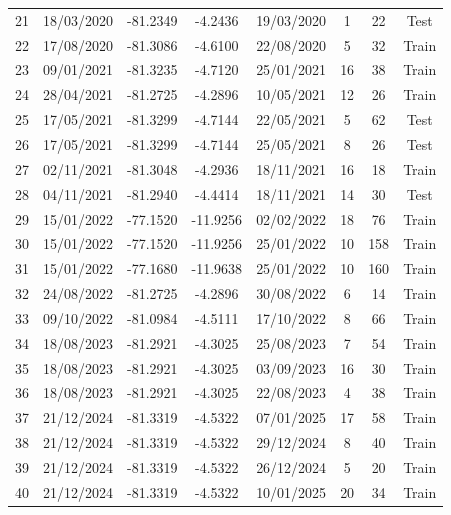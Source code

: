 \documentclass[11pt]{article}
\begin{document}
\begin{table}[htbp]
{\begin{tabular}{|c|c|c|c|c|c|c|c|}
21 & 18/03/2020 & -81.2349 & -4.2436 & 19/03/2020 & 1 & 22 & Test \\
22 & 17/08/2020 & -81.3086 & -4.6100 & 22/08/2020 & 5 & 32 & Train \\
23 & 09/01/2021 & -81.3235 & -4.7120 & 25/01/2021 & 16 & 38 & Train \\
24 & 28/04/2021 & -81.2725 & -4.2896 & 10/05/2021 & 12 & 26 & Train \\
25 & 17/05/2021 & -81.3299 & -4.7144 & 22/05/2021 & 5 & 62 & Test \\
26 & 17/05/2021 & -81.3299 & -4.7144 & 25/05/2021 & 8 & 26 & Test \\
27 & 02/11/2021 & -81.3048 & -4.2936 & 18/11/2021 & 16 & 18 & Train \\
28 & 04/11/2021 & -81.2940 & -4.4414 & 18/11/2021 & 14 & 30 & Test \\
29 & 15/01/2022 & -77.1520 & -11.9256 & 02/02/2022 & 18 & 76 & Train \\
30 & 15/01/2022 & -77.1520 & -11.9256 & 25/01/2022 & 10 & 158 & Train \\
31 & 15/01/2022 & -77.1680 & -11.9638 & 25/01/2022 & 10 & 160 & Train \\
32 & 24/08/2022 & -81.2725 & -4.2896 & 30/08/2022 & 6 & 14 & Train \\
33 & 09/10/2022 & -81.0984 & -4.5111 & 17/10/2022 & 8 & 66 & Train \\
34 & 18/08/2023 & -81.2921 & -4.3025 & 25/08/2023 & 7 & 54 & Train \\
35 & 18/08/2023 & -81.2921 & -4.3025 & 03/09/2023 & 16 & 30 & Train \\
36 & 18/08/2023 & -81.2921 & -4.3025 & 22/08/2023 & 4 & 38 & Train \\
37 & 21/12/2024 & -81.3319 & -4.5322 & 07/01/2025 & 17 & 58 & Train \\
38 & 21/12/2024 & -81.3319 & -4.5322 & 29/12/2024 & 8 & 40 & Train \\
39 & 21/12/2024 & -81.3319 & -4.5322 & 26/12/2024 & 5 & 20 & Train \\
40 & 21/12/2024 & -81.3319 & -4.5322 & 10/01/2025 & 20 & 34 & Train \\
\hline
\end{tabular}
}
\end{table}
\end{document}
